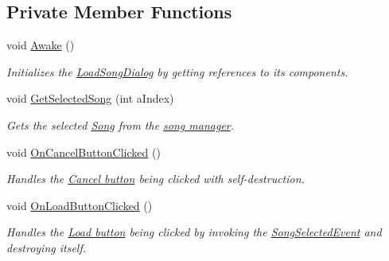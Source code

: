 \subsection*{Private Member Functions}
\begin{DoxyCompactItemize}
\item 
void \hyperlink{group___s_c___l_s_d_unity_ga84a200b08f9e504feff7fb0580753097}{Awake} ()
\begin{DoxyCompactList}\small\item\em Initializes the \hyperlink{class_load_song_dialog}{Load\+Song\+Dialog} by getting references to its components. \end{DoxyCompactList}\item 
void \hyperlink{group___s_c___l_s_d_handlers_gaee199e632420eac43fb6c35388d3fd69}{Get\+Selected\+Song} (int a\+Index)
\begin{DoxyCompactList}\small\item\em Gets the selected \hyperlink{class_song}{Song} from the \hyperlink{class_song_manager_class}{song manager}. \end{DoxyCompactList}\item 
void \hyperlink{group___s_c___l_s_d_handlers_ga4e0ea30af2357e80922f0ada2b2c82b0}{On\+Cancel\+Button\+Clicked} ()
\begin{DoxyCompactList}\small\item\em Handles the \hyperlink{group___s_c___l_s_d_priv_var_ga80d9f1687c8636fa476961057a31453f}{Cancel button} being clicked with self-\/destruction. \end{DoxyCompactList}\item 
void \hyperlink{group___s_c___l_s_d_handlers_ga362157bd83ce545da96f464a23b7ec73}{On\+Load\+Button\+Clicked} ()
\begin{DoxyCompactList}\small\item\em Handles the \hyperlink{group___s_c___l_s_d_priv_var_ga9957d4b958eff0baad80c6f787e0cb66}{Load button} being clicked by invoking the \hyperlink{group___s_c___l_s_d_event_types_class_load_song_dialog_1_1_song_selected_event}{Song\+Selected\+Event} and destroying itself. \end{DoxyCompactList}\end{DoxyCompactItemize}
